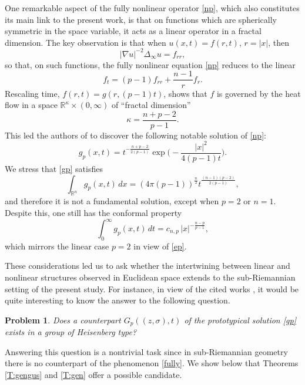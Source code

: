 \documentclass[11pt,a4paper]{amsart}
\def \R {\mathbb{R}}
\newcommand{\Rn}{\mathbb R^n}
\numberwithin{equation}{section}
\newtheorem{prob}{Problem}
\numberwithin{equation}{section}
\begin{document}
One remarkable aspect of the fully nonlinear operator \eqref{np}, which also constitutes its main link to the present work, is that on functions which are spherically symmetric in the space variable, it  acts as a linear operator in a fractal dimension. The key observation is that when $u(x,t)=f(r,t)$, $r=|x|$, then
\begin{equation}\label{fully}
|\nabla u|^{-2}\Delta_\infty u = f_{rr},
\end{equation}
so that, on such functions, the fully nonlinear equation \eqref{np} reduces to the linear
\begin{equation}\label{f}
f_t = (p-1)f_{rr} + \frac{n-1}{r}f_r.
\end{equation}
Rescaling time, $f(r,t) = g(r,(p-1)t)$, shows that $f$ is governed by the heat flow in a space $\R^\kappa\times (0,\infty)$ of ``fractal dimension''
\begin{equation}\label{k}
\kappa = \frac{n+p-2}{p-1}.
\end{equation}
This led the authors of \cite{BG} to discover the following notable solution of \eqref{np}:
\begin{equation}\label{gp}
g_p(x,t)
 = t^{-\frac{n+p-2}{2(p-1)}}
   \exp\bigg(-\frac{|x|^2}{4(p-1)t}\bigg).
\end{equation}
We stress that \eqref{gp} satisfies
\[
\int_{\Rn} g_p(x,t)\, dx
   = (4\pi(p-1))^{\frac n2}
     t^{\frac{(n-1)(p-2)}{2(p-1)}},
\]
and therefore it is not a fundamental solution, except when $p=2$ or $n=1$. Despite this, one still has the conformal property
\begin{equation}\label{intgp}
\int_0^\infty g_p(x,t)\, dt
   = c_{n,p}\, |x|^{-\frac{n-p}{p-1}},
\end{equation}
which mirrors the linear case $p=2$ in view of \eqref{ep}.


These considerations led us to ask whether the intertwining between linear and nonlinear structures observed in Euclidean space extends to the sub-Riemannian setting of the present study. For instance, in view of the cited works \cite{BG, BGM}, it would be quite interesting to know the answer to the following question.

\begin{prob}\label{P:one}
Does a counterpart $G_p((z,\sigma),t)$ of the prototypical solution \eqref{gp} exists in a group of Heisenberg type?
\end{prob}

Answering this question is a nontrivial task since in sub-Riemannian geometry there is no counterpart of the phenomenon \eqref{fully}. We show below that Theorems \ref{T:gengus} and \ref{T:gen} offer a possible candidate.
\end{document}
